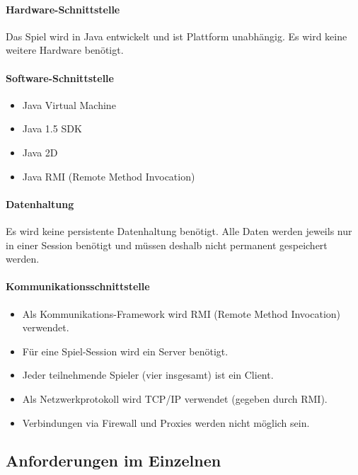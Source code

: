 \documentclass[a4paper,12pt,halfparskip,DIV14]{scrartcl}
\begin{document}
\paragraph{Hardware-Schnittstelle}\label{ssub:hardware_schnittstelle} %
Das Spiel wird in Java entwickelt und ist Plattform unabhängig. Es wird keine weitere Hardware benötigt.
\paragraph{Software-Schnittstelle}\label{ssub:software_schnittstelle} %
\begin{itemize}
	\item Java Virtual Machine
	\item Java 1.5 SDK
	\item Java 2D
	\item Java RMI (Remote Method Invocation)
\end{itemize}
\paragraph{Datenhaltung}\label{ssub:datenhaltung} %
Es wird keine persistente Datenhaltung benötigt. Alle Daten werden jeweils nur in einer Session benötigt und müssen deshalb nicht permanent gespeichert werden.
\paragraph{Kommunikationsschnittstelle}\label{ssub:kommunikationsschnittstelle} %
\begin{itemize}
	\item Als Kommunikations-Framework wird RMI (Remote Method Invocation) verwendet.
	\item Für eine Spiel-Session wird ein Server benötigt.
	\item Jeder teilnehmende Spieler (vier insgesamt) ist ein Client.
	\item Als Netzwerkprotokoll wird TCP/IP verwendet (gegeben durch RMI).
	\item Verbindungen via Firewall und Proxies werden nicht möglich sein.
\end{itemize}

\subsection{Anforderungen im Einzelnen}\label{sub:anforderungen_im_einzelnen} %
\end{document}
